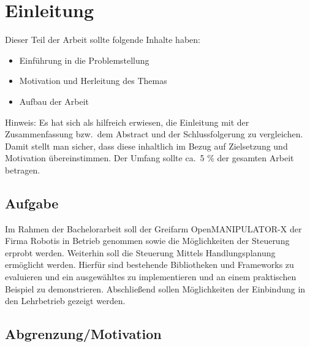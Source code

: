 \section{Einleitung} \label{einleitung}
Dieser Teil der Arbeit sollte folgende Inhalte haben:

\begin{itemize}
\item Einführung in die Problemstellung
\item Motivation und Herleitung des Themas
\item Aufbau der Arbeit
\end{itemize}

Hinweis:
Es hat sich als hilfreich erwiesen, die Einleitung mit der Zusammenfassung bzw.\ dem Abstract und der Schlussfolgerung zu vergleichen.
Damit stellt man sicher, dass diese inhaltlich im Bezug auf Zielsetzung und Motivation übereinstimmen.
Der Umfang sollte ca.\ 5 \% der gesamten Arbeit betragen.
\subsection{Aufgabe}
Im Rahmen der Bachelorarbeit soll der Greifarm OpenMANIPULATOR-X der Firma Robotis in Betrieb genommen sowie die Möglichkeiten der Steuerung erprobt werden.
Weiterhin soll die Steuerung Mittels Handlungsplanung ermöglicht werden.
Hierfür sind bestehende Bibliotheken und Frameworks zu evaluieren und ein ausgewähltes zu implementieren und an einem praktischen Beispiel zu demonstrieren.
Abschließend sollen Möglichkeiten der Einbindung in den Lehrbetrieb gezeigt werden.
\subsection{Abgrenzung/Motivation}

